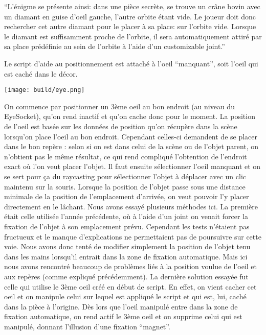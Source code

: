 \documentclass[12pt]{article}
\begin{document}
“L’énigme se présente ainsi: dans une pièce secrète, se trouve un crâne bovin avec un diamant en guise d’oeil gauche, l’autre orbite étant vide. Le joueur doit donc rechercher cet autre diamant pour le placer à sa place: sur l’orbite vide. Lorsque le diamant est suffisamment proche de l’orbite, il sera automatiquement attiré par sa place prédéfinie au sein de l’orbite à l’aide d’un customizable joint.”

Le script d’aide au positionnement est attaché à l’oeil “manquant”, soit l’oeil qui est caché dans le décor.

\begin{center}
    \texttt{[image: build/eye.png]}
\end{center}

On commence par positionner un 3ème oeil au bon endroit (au niveau du EyeSocket), qu’on rend inactif et qu’on cache donc pour le moment. La position de l’oeil est basée sur les données de position qu’on récupère dans la scène lorsqu’on place l’oeil au bon endroit. Cependant celles-ci demandent de se placer dans le bon repère : selon si on est dans celui de la scène ou de l’objet parent, on n’obtient pas le même résultat, ce qui rend compliqué l’obtention de l’endroit exact où l’on veut placer l’objet.
Il faut ensuite sélectionner l’oeil manquant et on se sert pour ça du raycasting pour sélectionner l’objet à déplacer avec un clic maintenu sur la souris. Lorsque la position de l’objet passe sous une distance minimale de la position de l'emplacement d’arrivée, on veut pouvoir l’y placer directement en le lâchant.
Nous avons essayé plusieurs méthodes ici. La première était celle utilisée l’année précédente, où à l’aide d’un joint on venait forcer la fixation de l’objet à son emplacement prévu. Cependant les tests n’étaient pas fructueux et le manque d’explications ne permettaient pas de poursuivre sur cette voie.
Nous avons donc tenté de modifier simplement la position de l’objet tenu dans les mains lorsqu’il entrait dans la zone de fixation automatique. Mais ici nous avons rencontré beaucoup de problèmes liés à la position voulue de l’oeil et aux repères (comme expliqué précédemment).
La dernière solution essayée fut celle qui utilise le 3ème oeil créé en début de script. En effet, on vient cacher cet oeil et on manipule celui sur lequel est appliqué le script et qui est, lui, caché dans la pièce à l’origine. Dès lors que l’oeil manipulé entre dans la zone de fixation automatique, on rend actif le 3ème oeil et on supprime celui qui est manipulé, donnant l’illusion d’une fixation “magnet”.
\end{document}
